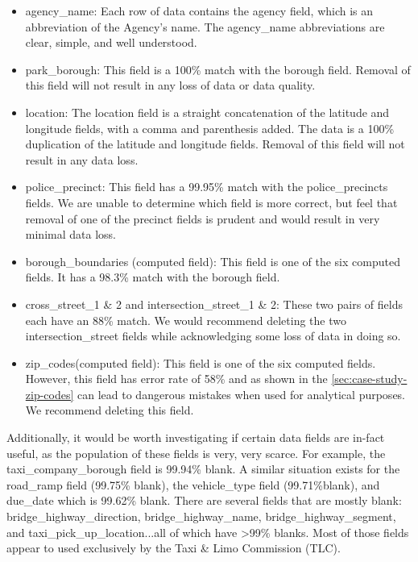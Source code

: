 \documentclass[12pt, titlepage]{article}
\begin{document}
\begin{itemize}
	\item agency\_name: Each row of data contains the agency field, 
	which is an abbreviation of the Agency's name. The agency\_name 
	abbreviations are clear, simple, and well understood.
		    
	\item park\_borough:  This field is a 100\% match with the 
	borough field. Removal of this field will not result in any loss of 
	data or data quality.
		    
	\item location:  The location field is a straight concatenation of 
	the latitude and longitude fields, with a comma and parenthesis 
	added. The data is a 100\% duplication of the latitude 
	and longitude fields. Removal of this field will not 
	result in any data loss.
		    
	\item police\_precinct: This field has a 99.95\% match with the 
	police\_precincts fields. We are unable to determine which field 
	is more correct, but feel that removal of one of the precinct fields 
	is prudent and would result in very minimal data loss.
		   
	\item borough\_boundaries (computed field): This field is one of 
	the six computed fields. It has a 98.3\% match with the borough 
	field.
		    
	\item cross\_street\_1 \& 2 and intersection\_street\_1 \& 2: These 
	two pairs of fields each have an 88\% match. We would recommend 
	deleting the two intersection\_street fields while acknowledging 
	some loss of data in doing so.
		     
	\item zip\_codes(computed field):  This field is one of the six 
	computed fields.  However, this field has error rate of 58\% and 
	as shown in the \ref{sec:case-study-zip-codes} can lead to 
	dangerous mistakes when used for analytical purposes. 
	We recommend deleting this field.
\end{itemize}
 	
Additionally, it would be worth investigating if certain data fields are 
in-fact useful, as the population of these fields is very, very scarce. For 
example, the taxi\_company\_borough field is 99.94\% 
blank. A similar situation exists for the road\_ramp field 
(99.75\% blank), the vehicle\_type field (99.71\%blank), and 
due\_date which is 99.62\% blank. There are several fields that are 
mostly blank: bridge\_highway\_direction, bridge\_highway\_name, 
bridge\_highway\_segment, and taxi\_pick\_up\_location...all 
of which have \textgreater99\% blanks. Most of those fields 
appear to used exclusively by the Taxi \& Limo Commission (TLC).   
\end{document}
